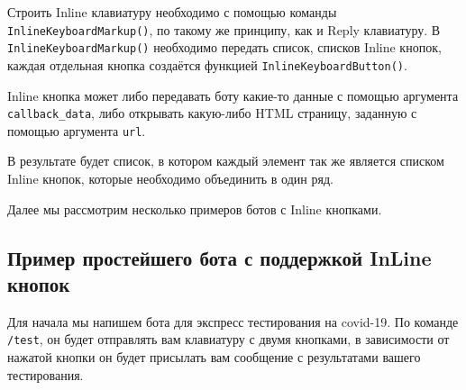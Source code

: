 \documentclass[
]{book}
\begin{document}
Строить Inline клавиатуру необходимо с помощью команды \texttt{InlineKeyboardMarkup()}, по такому же принципу, как и Reply клавиатуру. В \texttt{InlineKeyboardMarkup()} необходимо передать список, списков Inline кнопок, каждая отдельная кнопка создаётся функцией \texttt{InlineKeyboardButton()}.

Inline кнопка может либо передавать боту какие-то данные с помощью аргумента \texttt{callback\_data}, либо открывать какую-либо HTML страницу, заданную с помощью аргумента \texttt{url}.

В результате будет список, в котором каждый элемент так же является списком Inline кнопок, которые необходимо объединить в один ряд.

Далее мы рассмотрим несколько примеров ботов с Inline кнопками.

\hypertarget{ux43fux440ux438ux43cux435ux440-ux43fux440ux43eux441ux442ux435ux439ux448ux435ux433ux43e-ux431ux43eux442ux430-ux441-ux43fux43eux434ux434ux435ux440ux436ux43aux43eux439-inline-ux43aux43dux43eux43fux43eux43a}{%
\subsection{Пример простейшего бота с поддержкой InLine кнопок}\label{ux43fux440ux438ux43cux435ux440-ux43fux440ux43eux441ux442ux435ux439ux448ux435ux433ux43e-ux431ux43eux442ux430-ux441-ux43fux43eux434ux434ux435ux440ux436ux43aux43eux439-inline-ux43aux43dux43eux43fux43eux43a}}

Для начала мы напишем бота для экспресс тестирования на covid-19. По команде \texttt{/test}, он будет отправлять вам клавиатуру с двумя кнопками, в зависимости от нажатой кнопки он будет присылать вам сообщение с результатами вашего тестирования.
\end{document}
